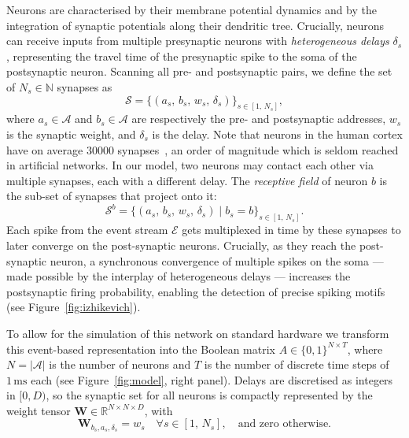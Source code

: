 \documentclass{article}
\begin{document}
Neurons are characterised by their membrane potential dynamics and by the integration of synaptic potentials along their dendritic tree. Crucially, neurons can receive inputs from multiple presynaptic neurons with \emph{heterogeneous delays} $\delta_s$, representing the travel time of the presynaptic spike to the soma of the postsynaptic neuron. Scanning all pre- and postsynaptic pairs, we define the set of $N_s \in \mathbb{N}$ synapses as
\[
  \mathcal{S}
  = \bigl\{(a_s,\, b_s,\, w_s,\, \delta_s)\bigr\}_{s \in [1,\, N_s]},
\]
where $a_s \in \mathcal{A}$ and $b_s \in \mathcal{A}$ are respectively the pre- and postsynaptic addresses, $w_s$ is the synaptic weight, and $\delta_s$ is the delay. Note that neurons in the human cortex have on average 30000 synapses~\citep{Rockland2002}, an order of magnitude which is seldom reached in artificial networks. In our model, two neurons may contact each other via multiple synapses, each with a different delay. The \emph{receptive field} of neuron $b$ is the sub-set of synapses that project onto it:
\[
  \mathcal{S}^b
  = \bigl\{(a_s,\, b_s,\, w_s,\, \delta_s) \mid b_s = b
    \bigr\}_{s \in [1,\, N_s]}.
\]
Each spike from the event stream $\mathcal{E}$ gets multiplexed in time by these synapses to later converge on the post-synaptic neurons.
Crucially, as they reach  the post-synaptic neuron, a synchronous convergence of multiple spikes on the soma --- made possible by the interplay of heterogeneous delays --- increases the postsynaptic firing probability, enabling the detection of precise spiking motifs (see Figure~\ref{fig:izhikevich}).

To allow for the simulation of this network on standard hardware we transform this event-based representation into the Boolean matrix $A \in \{0,1\}^{N \times T}$, where $N = |\mathcal{A}|$ is the number of neurons and $T$ is the number of discrete time steps of $1\,\mathrm{ms}$ each (see Figure~\ref{fig:model}, right panel). Delays are discretised as integers in $[0, D)$, so the synaptic set for all neurons is compactly represented by
the weight tensor
$\mathbf{W} \in \mathbb{R}^{N \times N \times D}$, with
\[
  \mathbf{W}_{b_s, a_s, \delta_s} = w_s
  \quad \forall s \in [1,\, N_s],
  \quad \text{and zero otherwise.}
\]
\end{document}
